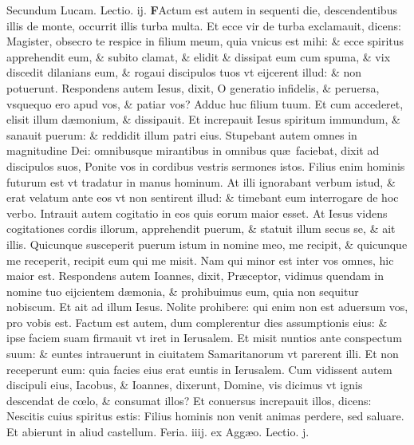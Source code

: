 \documentclass[a5paper,10pt]{book}
\def\leftmarginnote{%
	\lrmarginnote{\hskip -\marginparsep \hskip -6.5em}}
\def\ae{æ}
\def\oe{œ}
\begin{document}
\begin{multicols*}{2}
\fancyhead[C]{\color{red} Feria. iij. Dominic\ae . iiij. aduentus}
\newline \color{red} Secundum Lucam. \hfill Lectio. ij. \color{black}
\vspace{-.25em}
\lettrine[lines=2]{\bfseries \color{red} F}{}Actum\leftmarginnote{\begin{flushright}ca. 9.\end{flushright}} est autem in sequenti die, descendentibus illis de monte, occurrit illis turba multa.
Et ecce vir de turba exclamauit, dicens: Magister, obsecro te respice in filium meum, quia vnicus est mihi: \& ecce spiritus apprehendit eum, \& subito clamat, \& elidit \& dissipat eum cum spuma, \& vix discedit dilanians eum, \& rogaui discipulos tuos vt eijcerent illud: \& non potuerunt.
Respondens autem Iesus, dixit, O generatio infidelis, \& peruersa, vsquequo ero apud vos, \& patiar vos?
Adduc huc filium tuum. Et cum accederet, elisit illum d\ae monium, \& dissipauit.
Et increpauit Iesus spiritum immundum, \& sanauit puerum: \& reddidit illum patri eius.
Stupebant autem omnes in magnitudine Dei: omnibusque mirantibus in omnibus qu\ae \ faciebat, dixit ad discipulos suos, Ponite vos in cordibus vestris sermones istos.
Filius enim hominis futurum est vt tradatur in manus hominum.
At illi ignorabant verbum istud, \& erat velatum ante eos vt non sentirent illud: \& timebant eum interrogare de hoc verbo.
Intrauit autem cogitatio in eos quis eorum maior esset.
At Iesus videns cogitationes cordis illorum, apprehendit puerum, \& statuit illum secus se, \& ait illis.
Quicunque susceperit puerum istum in nomine meo, me recipit, \& quicunque me receperit, recipit eum qui me misit.
Nam qui minor est inter vos omnes, hic maior est.
Respondens autem Ioannes, dixit, Pr\ae ceptor, vidimus quendam in nomine tuo eijcientem d\ae monia, \& prohibuimus eum, quia non sequitur nobiscum.
Et ait ad illum Iesus. Nolite prohibere: qui enim non est aduersum vos, pro vobis est.
Factum est autem, dum complerentur dies assumptionis eius: \& ipse faciem suam firmauit vt iret in Ierusalem.
Et misit nuntios ante conspectum suum: \& euntes intrauerunt in ciuitatem Samaritanorum vt parerent illi.
Et non receperunt eum: quia facies eius erat euntis in Ierusalem.
Cum vidissent autem discipuli eius, Iacobus, \& Ioannes, dixerunt, Domine, vis dicimus vt ignis descendat de c\oe lo, \& consumat illos?
Et conuersus increpauit
illos, dicens: Nescitis cuius spiritus estis: Filius hominis non venit animas perdere, sed saluare.
Et abierunt in aliud castellum.
\newline {} \color{red} \hypertarget{WED-QVARTA-ADV}{Feria. iiij.} ex Agg\ae o. \hfill Lectio. j. \color{black}

\end{multicols*}
\end{document}
